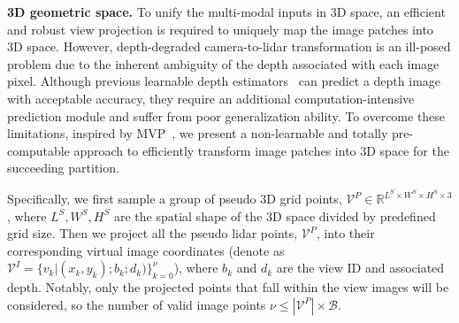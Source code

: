 \documentclass[10pt,twocolumn,letterpaper]{article}
\begin{document}
\noindent \textbf{3D geometric space.} To unify the multi-modal inputs in 3D space, an efficient and robust view projection is required to uniquely map the image patches into 3D space. However, depth-degraded camera-to-lidar transformation is an ill-posed problem due to the inherent ambiguity of the depth associated with each image pixel. Although previous learnable depth estimators~\cite{godard2017unsupervised,fu2018deep} can predict a depth image with acceptable accuracy, they require an additional computation-intensive prediction module and suffer from poor generalization ability. To overcome these limitations, inspired by MVP~\cite{yin2021multimodal}, we present a non-learnable and totally pre-computable approach to efficiently transform image patches into 3D space for the succeeding partition. 

Specifically, we first sample a group of pseudo 3D grid points, $\mathcal{V}^{P} \in \mathbb{R}^{L^S \times W^S \times H^S \times 3}$, where $L^S, W^S, H^S$ are the spatial shape of the 3D space divided by predefined grid size. Then we project all the pseudo lidar points, $\mathcal{V}^{P}$, into their corresponding virtual image coordinates (denote as $\mathcal{V}^{I}=\{v_k | (x_k, y_k); b_k; d_k)\}_{k=0}^{\nu}$), where $b_k$ and $d_k$ are the view ID and associated depth. Notably, only the projected points that fall within the view images will be considered, so the number of valid image points $\nu \le |\mathcal{V}^P| \times \mathcal{B}$.
\end{document}
